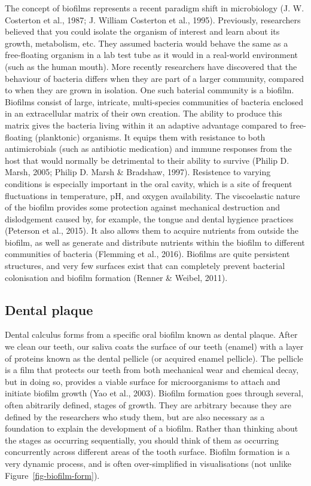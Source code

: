 \documentclass[
  letterpaper,
]{book}
\begin{document}
The concept of biofilms represents a recent paradigm shift in
microbiology (J. W. Costerton et al., 1987; J. William Costerton et al.,
1995). Previously, researchers believed that you could isolate the
organism of interest and learn about its growth, metabolism, etc. They
assumed bacteria would behave the same as a free-floating organism in a
lab test tube as it would in a real-world environment (such as the human
mouth). More recently researchers have discovered that the behaviour of
bacteria differs when they are part of a larger community, compared to
when they are grown in isolation. One such baterial community is a
biofilm. Biofilms consist of large, intricate, multi-species communities
of bacteria enclosed in an extracellular matrix of their own creation.
The ability to produce this matrix gives the bacteria living within it
an adaptive advantage compared to free-floating (planktonic) organisms.
It equips them with resistance to both antimicrobials (such as
antibiotic medication) and immune responses from the host that would
normally be detrimental to their ability to survive (Philip D. Marsh,
2005; Philip D. Marsh \& Bradshaw, 1997). Resistence to varying
conditions is especially important in the oral cavity, which is a site
of frequent fluctuations in temperature, pH, and oxygen availability.
The viscoelastic nature of the biofilm provides some protection against
mechanical destruction and dislodgement caused by, for example, the
tongue and dental hygience practices (Peterson et al., 2015). It also
allows them to acquire nutrients from outside the biofilm, as well as
generate and distribute nutrients within the biofilm to different
communities of bacteria (Flemming et al., 2016). Biofilms are quite
persistent structures, and very few surfaces exist that can completely
prevent bacterial colonisation and biofilm formation (Renner \& Weibel,
2011).

\hypertarget{dental-plaque}{%
\subsection{Dental plaque}\label{dental-plaque}}

Dental calculus forms from a specific oral biofilm known as dental
plaque. After we clean our teeth, our saliva coats the surface of our
teeth (enamel) with a layer of proteins known as the dental pellicle (or
acquired enamel pellicle). The pellicle is a film that protects our
teeth from both mechanical wear and chemical decay, but in doing so,
provides a viable surface for microorganisms to attach and initiate
biofilm growth (Yao et al., 2003). Biofilm formation goes through
several, often abitrarily defined, stages of growth. They are arbitrary
because they are defined by the researchers who study them, but are also
necessary as a foundation to explain the development of a biofilm.
Rather than thinking about the stages as occurring sequentially, you
should think of them as occurring concurrently across different areas of
the tooth surface. Biofilm formation is a very dynamic process, and is
often over-simplified in visualisations (not unlike
Figure~\ref{fig-biofilm-form}).
\end{document}
